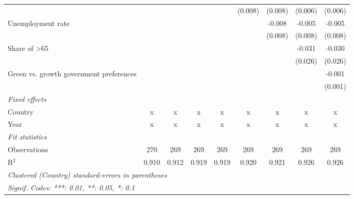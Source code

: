 \begin{table}[htbp]
\begin{tabular}{lcccccccc}
                                                      &         &         &                &                & (0.008)        & (0.008)        & (0.006)        & (0.006)\\   
      Unemployment rate                               &         &         &                &                &                & -0.008         & -0.005         & -0.005\\   
                                                      &         &         &                &                &                & (0.008)        & (0.008)        & (0.008)\\   
      Share of >65                                    &         &         &                &                &                &                & -0.031         & -0.030\\   
                                                      &         &         &                &                &                &                & (0.026)        & (0.026)\\   
      Green vs. growth government preferences         &         &         &                &                &                &                &                & -0.001\\   
                                                      &         &         &                &                &                &                &                & (0.001)\\   
      \emph{Fixed effects}\\
      Country                                         & x       & x       & x              & x              & x              & x              & x              & x\\  
      Year                                            & x       & x       & x              & x              & x              & x              & x              & x\\  
      \midrule \emph{Fit statistics}\\
      Observations                                    & 270     & 269     & 269            & 269            & 269            & 269            & 269            & 269\\  
      R$^2$                                           & 0.910   & 0.912   & 0.919          & 0.919          & 0.920          & 0.921          & 0.926          & 0.926\\  
      \midrule
      \multicolumn{9}{l}{\emph{Clustered (Country) standard-errors in parentheses}}\\
      \multicolumn{9}{l}{\emph{Signif. Codes: ***: 0.01, **: 0.05, *: 0.1}}\\
   \end{tabular}
\end{table}


